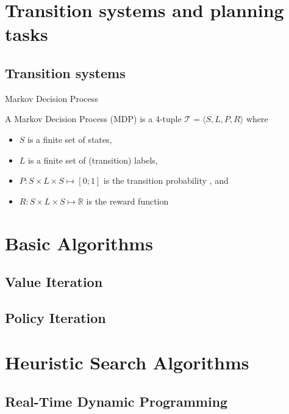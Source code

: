\documentclass{gkibeamer}
\begin{document}
\section{Transition systems and planning tasks}
\subsection{Transition systems}

\begin{frame}{Markov Decision Process}
  \begin{definition}
    A \alert{Markov Decision Process} (MDP) is a 4-tuple $\mathcal T =
    \langle S, L, P, R \rangle$ where
    \begin{itemize}
    \item $S$ is a finite set of \alert{states},
    \item $L$ is a finite set of (transition) \alert{labels},
    \item $P: S \times L \times S \mapsto [0;1]$ is the
    \alert{transition probability} %
    , and 
    \item $R: S \times L \times S \mapsto \mathbb{R}$ is the
    \alert{reward function}
    \end{itemize}
  \end{definition}
\end{frame}


\section{Basic Algorithms}
\subsection{Value Iteration}
\subsection{Policy Iteration}

\section{Heuristic Search Algorithms}
\subsection{Real-Time Dynamic Programming}
\end{document}
